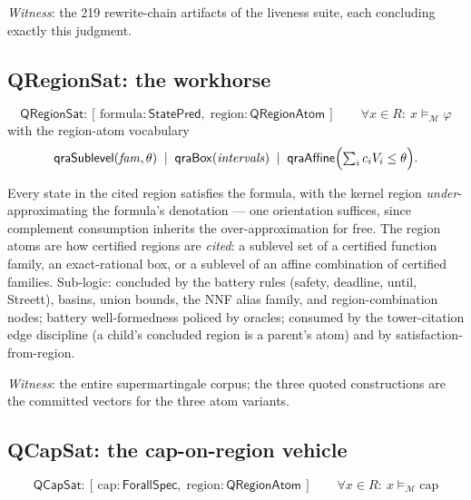 \emph{Witness}: the 219 rewrite-chain artifacts of the liveness
suite, each concluding exactly this judgment.



\subsection{QRegionSat: the workhorse}
\label{sec:spec-lang-qregionsat}

\[
\mathsf{QRegionSat} : [\, \mathrm{formula} : \mathsf{StatePred},\;
  \mathrm{region} : \mathsf{QRegionAtom} \,]
\qquad
\forall x \in R :\ x \vDash_{\mathcal{M}} \varphi
\]
with the region-atom vocabulary
\[
\mathsf{qraSublevel}(\mathit{fam}, \theta) \;\mid\;
\mathsf{qraBox}(\mathit{intervals}) \;\mid\;
\mathsf{qraAffine}\Bigl(\textstyle\sum_i c_i V_i \le \theta\Bigr).
\]

Every state in the cited region satisfies the formula, with the
kernel region \emph{under}-approximating the formula's denotation ---
one orientation suffices, since complement consumption inherits the
over-approximation for free. The region atoms are how certified
regions are \emph{cited}: a sublevel set of a certified function
family, an exact-rational box, or a sublevel of an affine combination
of certified families. Sub-logic: concluded by the battery rules
(safety, deadline, until, Streett), basins, union bounds, the NNF
alias family, and region-combination nodes; battery well-formedness
policed by oracles; consumed by the tower-citation edge discipline (a
child's concluded region is a parent's atom) and by
satisfaction-from-region.

\emph{Witness}: the entire supermartingale corpus; the three quoted
constructions are the committed vectors for the three atom variants.



\subsection{QCapSat: the cap-on-region vehicle}
\label{sec:spec-lang-qcapsat}

\[
\mathsf{QCapSat} : [\, \mathrm{cap} : \mathsf{ForallSpec},\;
  \mathrm{region} : \mathsf{QRegionAtom} \,]
\qquad
\forall x \in R :\ x \vDash_{\mathcal{M}} \mathrm{cap}
\]

